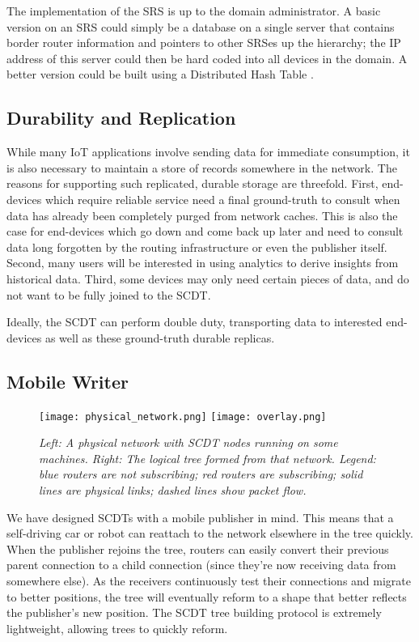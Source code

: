 The implementation of the SRS is up to the domain administrator.  A basic version on an SRS could simply be a database on a single server that contains border router information and pointers to other SRSes up the
hierarchy; the IP address of this server could then be hard coded into all
devices in the domain.  A better version could be built using a Distributed Hash
Table \cite{chord, tapestry}.

\subsection{Durability and Replication}
\label{durability-replication}

While many IoT applications involve sending data for immediate consumption, it is also necessary to maintain a store of records somewhere in the network.  The reasons for supporting such replicated, durable storage are threefold.  First, end-devices which require reliable service need a final ground-truth to consult when data has already been completely purged from network caches.  This is also the case for end-devices which go down and come back up later and need to consult data long forgotten by the routing infrastructure or even the publisher itself.  Second, many users will be interested in using analytics to derive insights from historical data.  Third, some devices may only need certain pieces of data, and do not want to be fully joined to the SCDT.

Ideally, the SCDT can perform double duty, transporting data to interested end-devices as well as these ground-truth durable replicas.

\subsection{Mobile Writer}
\label{mobile-writer}
\begin{figure}[t]
	\begin{center}
		\texttt{[image: physical\_network.png]}
		\texttt{[image: overlay.png]}
	\end{center}
	\vspace{-1.3em}
	\caption{\small \itshape Left: A physical network with SCDT nodes running on some machines.  Right: The logical tree formed from that network.  Legend: blue routers are not subscribing; red routers are subscribing; solid lines are physical links; dashed lines show packet flow.}
	\vspace{-1em}
	\label{fig:multicast-tree}
\end{figure}
We have designed SCDTs with a mobile publisher in mind. This means that a self-driving car or robot can reattach to the network elsewhere in the tree quickly. When the publisher rejoins the tree, routers can easily convert their previous parent connection to a child connection (since they're now receiving data from somewhere else). As the receivers continuously test their connections and migrate to better positions, the tree will eventually reform to a shape that better reflects the publisher's new position. The SCDT tree building protocol is extremely lightweight, allowing trees to quickly reform.

